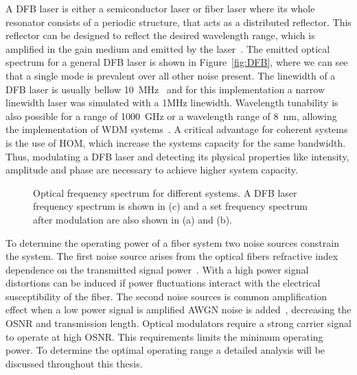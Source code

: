  
A DFB laser is either a semiconductor laser or fiber laser where its whole resonator consists of a periodic structure, that acts as a distributed reflector. This reflector can be designed to reflect the desired wavelength range, which is amplified in the gain medium and emitted by the laser~\cite{FundPhoto,DFBtunable}. The emitted optical spectrum for a general DFB laser is shown in Figure~\ref{fig:DFB}, where we can see that a single mode is prevalent over all other noise present.
The linewidth of a DFB laser is usually bellow 10~MHz~\cite{kikuchi2010coherent} and for this implementation a narrow linewidth laser was simulated with a 1MHz linewidth. Wavelength  tunability is also possible for a range of 1000~GHz or a wavelength range of 8~nm, allowing the implementation of WDM systems~\cite{kikuchi2010coherent,DFBtunable}. A critical advantage for coherent systems is the use of HOM, which increase the systems capacity for the same bandwidth. Thus, modulating a DFB laser and detecting its physical properties like intensity, amplitude and phase are necessary to achieve higher system capacity.   
 \begin{figure}[h]
  \centering
  \qquad
  \qquad
  \caption{Optical frequency spectrum for different systems. A DFB laser frequency spectrum is shown in (c) and a set frequency spectrum after modulation are also shown in (a) and (b). }
  \label{fig:OpSpectrum}
\end{figure}

 To determine the operating power of a fiber system two noise sources constrain the system. The first noise source arises from the optical fibers refractive index dependence on the transmitted signal power~\cite{FiberAgrawal}. With a high power signal distortions can be induced if power fluctuations interact with the electrical susceptibility of the fiber. The second noise sources is common amplification effect when a low power signal is amplified AWGN noise is added~\cite{agrawal2001applications}, decreasing the OSNR and transmission length. Optical modulators require a strong carrier signal to operate at high OSNR. This requirements limits the minimum operating power. To determine the optimal operating range a detailed analysis will be discussed throughout this thesis.   


